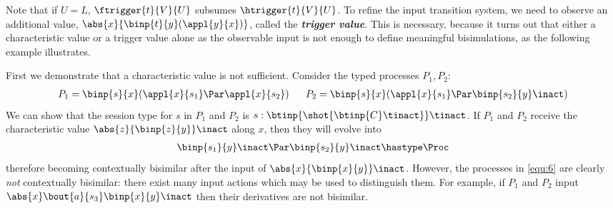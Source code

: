 Note that if $U=L$, $\ftrigger{t}{V}{U}$ subsumes 
$\htrigger{t}{V}{U}$. 
To refine the input transition system, we need to observe 
an additional value, 
$\abs{{x}}{\binp{t}{y} (\appl{y}{{x}})}$, 
called the {\bf\em trigger value}. 
This is necessary, because it turns out
that 
either a characteristic value or 
a trigger value alone as the observable input 
is not enough to define meaningful bisimulations,
as the following example illustrates.
\begin{example}
%
First we demonstrate that a characteristic value is not sufficient. 
Consider the typed processes $P_1, P_2$:
%
\begin{eqnarray}
	P_1 = \binp{s}{x} (\appl{x}{s_1} \Par \appl{x}{s_2}) & ~~&
	P_2 = \binp{s}{x} (\appl{x}{s_1} \Par \binp{s_2}{y} \inact) 
	\label{equ:6}
\end{eqnarray}
%
We can show that 
the session type for $s$ in $P_1$ and $P_2$ is 
$s: \btinp{\shot{\btinp{C} \tinact}} \tinact$.
If $P_1$ and $P_2$ 
receive 
the characteristic value $\abs{z}{\binp{z}{y}} \inact$ along $x$, 
then they will evolve into %
%
\begin{eqnarray*}
	\binp{s_1}{y} \inact \Par \binp{s_2}{y} \inact \hastype \Proc
\end{eqnarray*}
%
therefore becoming 
contextually bisimilar after the input of
 $\abs{x}{\binp{x}{y}} \inact$.
However, the processes in \eqref{equ:6}
are clearly {\em not} contextually bisimilar: there exist many input actions
which may be used to distinguish them.
For example, if 
$P_1$ and $P_2$ input 
 $\abs{x} \bout{a}{s_3} \binp{x}{y} \inact$ then
their derivatives are not bisimilar. 


\end{example}
